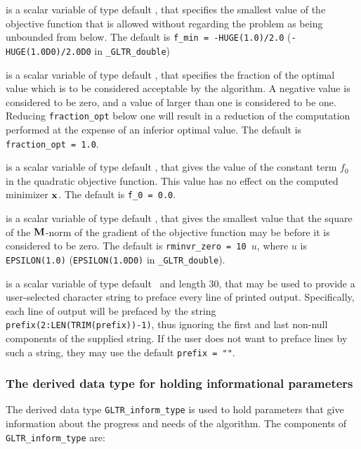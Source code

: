 \documentclass{galahad}
\newcommand{\packagename}{GL\-TR}
\newcommand{\fullpackagename}{\libraryname\_\packagename}
\begin{document}
\begin{description}
 is a scalar variable of type default
\realdp, that specifies the smallest value of the objective function
that is allowed without regarding the problem as being unbounded
from below. The default is {\tt f\_min = -HUGE(1.0)/2.0}
({\tt -HUGE(1.0D0)/2.0D0} in {\tt \fullpackagename\_double})

 is a scalar variable of type default
\realdp, that specifies the fraction
of the optimal value which is to be considered acceptable by the algorithm.
A negative value is considered to be zero, and a value of larger than one
is considered to be one. Reducing {\tt fraction\_opt} below one will result
in a reduction of the computation performed at the expense of an inferior
optimal value.
The default is {\tt fraction\_opt = 1.0}.

 is a scalar variable of type default
\realdp, that gives the value of the constant term $f_0$ in the
quadratic objective function. This value has no effect on the
computed minimizer ${\mathbf{x}}$. The default is {\tt f\_0 = 0.0}.

 is a scalar variable of type default
\realdp, that gives the smallest value that the square of the ${\mathbf{M}}$-norm of the
gradient of the objective function may be before it is considered to be zero.
The default is {\tt rminvr\_zero = 10 $u$},
where $u$ is {\tt EPSILON(1.0)} ({\tt EPSILON(1.0D0)} in
{\tt \fullpackagename\_double}).

 is a scalar variable of type default \character\
and length 30, that may be used to provide a user-selected
character string to preface every line of printed output.
Specifically, each line of output will be prefaced by the string
{\tt prefix(2:LEN(TRIM(prefix))-1)},
thus ignoring the first and last non-null components of the
supplied string. If the user does not want to preface lines by such
a string, they may use the default {\tt prefix = ""}.

\end{description}


\subsubsection{The derived data type for holding informational
 parameters}\label{typeinfo}
The derived data type
{\tt \packagename\_inform\_type}
is used to hold parameters that give information about the progress and needs
of the algorithm. The components of
{\tt \packagename\_inform\_type}
are:
\end{document}
